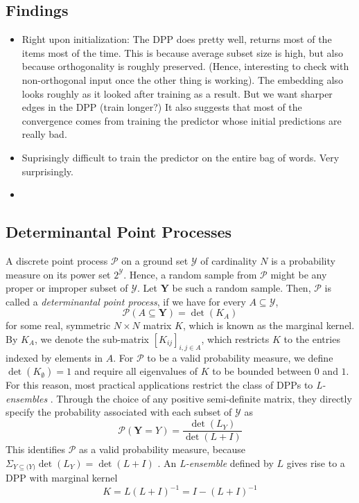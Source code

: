 \documentclass[12pt, oneside]{article}   	%
\begin{document}
\subsection*{Findings}
\begin{itemize}
\item Right upon initialization: The DPP does pretty well, returns most of the items most of the time. This is because average subset size is high, but also because orthogonality is roughly preserved. (Hence, interesting to check with non-orthogonal input once the other thing is working). The embedding also looks roughly as it looked after training as a result. But we want sharper edges in the DPP (train longer?) It also suggests that most of the convergence comes from training the predictor whose initial predictions are really bad. 
\item Suprisingly difficult to train the predictor on the entire bag of words. Very surprisingly.
\item 
\end{itemize}


\subsection*{Determinantal Point Processes}

A discrete point process $\mathcal{P}$ on a ground set $\mathcal{Y}$ of cardinality $N$ is a probability measure on its power set $2^{\mathcal{Y}}$. Hence, a random sample from $\mathcal{P}$ might be any proper or improper subset of $\mathcal{Y}$. Let $\textbf{Y}$ be such a random sample. Then, $\mathcal{P}$  is called a \textit{determinantal point process}, if we have for every $A \subseteq \mathcal{Y}$, 
\begin{equation}
\mathcal{P}( A \subseteq \textbf{Y}) = \det(K_{A})
\end{equation}
for some real, symmetric $N\times N$ matrix $K$, which is known as the marginal kernel. By $K_{A}$, we denote the sub-matrix $[K_{ij}]_{i,j \in A}$, which restricts $K$ to the entries indexed by elements in $A$. For $\mathcal{P}$ to be a valid probability measure, we define $\det(K_{\emptyset}) = 1$ and require all eigenvalues of $K$ to be bounded between $0$ and $1$. For this reason, most practical applications restrict the class of DPPs to \textit{L-ensembles} \cite{Lensemble}. Through the choice of any positive semi-definite matrix, they directly specify the probability associated with  each subset of $\mathcal{Y}$ as
\begin{equation}
\mathcal{P}(\textbf{Y} = Y) = \frac{\det(L_{Y})}{\det(L + I)}
\end{equation}
This identifies $\mathcal{P}$  as a valid probability measure, because $\Sigma_{Y \subseteq \mathcal(Y)} \det(L_{Y}) = \det(L + I)$ \cite{kulesza2012learning}. An \textit{L-ensemble} defined by $L$ gives rise to a DPP with marginal kernel 
\begin{equation}
K = L(L+I)^{-1} = I - (L + I)^{-1}
\end{equation}
\end{document}
